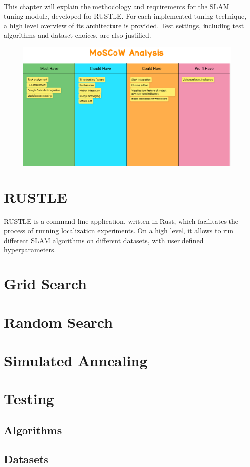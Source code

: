 \paragraph{}This chapter will explain the methodology and requirements for the \ac{SLAM} tuning module, developed for \ac{RUSTLE}. For each implemented tuning technique, a high level overview of its architecture is provided. Test settings, including test algorithms and dataset choices, are also justified.

\begin{figure}[h]
\includegraphics[width=0.85\linewidth]{images/moscow.png}
\end{figure}

\section{\ac{RUSTLE}}

\paragraph{}\ac{RUSTLE} is a command line application, written in Rust, which facilitates the process of running localization experiments. On a high level, it allows to run different SLAM algorithms on different datasets, with user defined hyperparameters.

\section{Grid Search}

\section{Random Search}

\section{Simulated Annealing}

\section{Testing}

\subsection{Algorithms}

\subsection{Datasets}